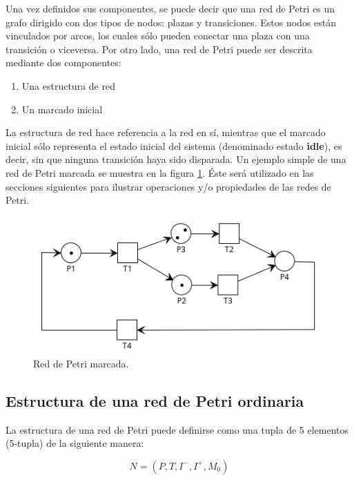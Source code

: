 Una vez definidos sus componentes, se puede decir que una red de Petri es un grafo dirigido con dos tipos de nodos: plazas y transiciones. Estos nodos están vinculados por arcos, los cuales sólo pueden conectar una plaza con una transición o viceversa. Por otro lado, una red de Petri puede ser descrita mediante dos componentes:

\begin{enumerate}
    \item Una estructura de red
    \item Un marcado inicial
\end{enumerate}

La estructura de red hace referencia a la red en sí, mientras que el marcado inicial sólo representa el estado inicial del sistema (denominado estado \textbf{idle}), es decir, sin que ninguna transición haya sido disparada. Un ejemplo simple de una red de Petri marcada se muestra en la figura \ref{fig:rdp2.1_tradicional}. Éste será utilizado en las secciones siguientes para ilustrar operaciones y/o propiedades de las redes de Petri. 

\begin{figure}[H]
	\centering
	\includegraphics[scale=1.0]{Figures/marco teorico/imag1.png}
	\caption{Red de Petri marcada.}
	\label{fig:rdp2.1_tradicional}
  \end{figure}


\subsection{Estructura de una red de Petri ordinaria} %
La estructura de una red de Petri puede definirse como una tupla de 5 elementos (5-tupla)\cite{falko} de la siguiente manera:

\begin{equation}
    N = (P, T, I^- , I^+ , M_0) 
\end{equation}

